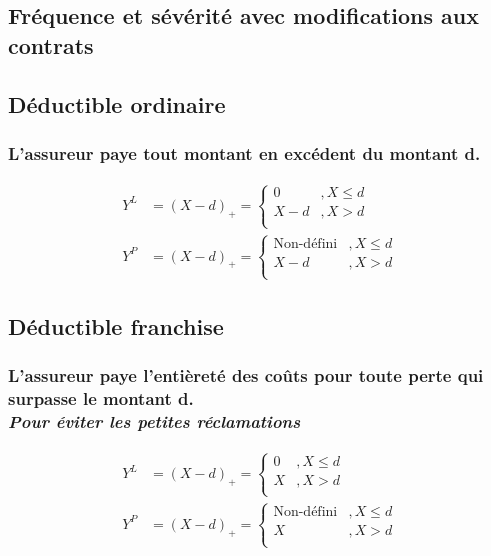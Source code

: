 \documentclass[french, landscape]{article}
\begin{document}
\begin{multicols*}{3}
\setcounter{section}{7}
\section{Fréquence et sévérité avec modifications aux contrats}
\subsection*{Déductible ordinaire}

\subsubsection*{L'assureur paye tout montant en excédent du montant d.}
\begin{align*}
Y^L &= (X-d)_+ = 
	\begin{cases}
		0		& , X \leq d \\
		X - d	& , X > d \\
	\end{cases} \\
Y^P &= (X-d)_+ = 
	\begin{cases}
		\text{Non-défini}	& , X \leq d \\
		X - d				& , X > d \\
	\end{cases}
\end{align*}

\subsection*{Déductible franchise}
\subsubsection*{L'assureur paye l'entièreté des coûts pour toute perte qui surpasse le montant d.\\ \textit{Pour éviter les petites réclamations}}
\begin{align*}
Y^L &= (X-d)_+ = 
	\begin{cases}
		0		& , X \leq d \\
		X		& , X > d \\
	\end{cases} \\
Y^P &= (X-d)_+ = 
	\begin{cases}
		\text{Non-défini}	& , X \leq d \\
		X 					& , X > d \\
	\end{cases}
\end{align*}


\end{multicols*}
\end{document}
